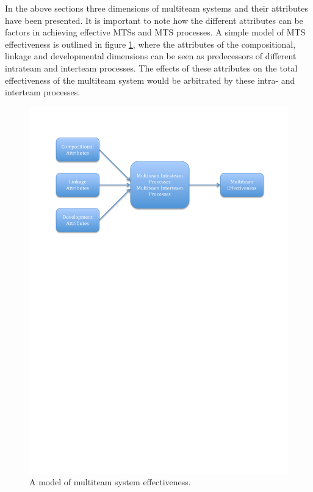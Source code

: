 In the above sections three dimensions of multiteam systems and their attributes have been presented. It is important to note how the different attributes can be factors in achieving effective MTSs and MTS processes. A simple model of MTS effectiveness is outlined in figure \ref{amomse}, where the attributes of the compositional, linkage and developmental dimensions can be seen as predecessors of different intrateam and interteam processes. The effects of these attributes on the total effectiveness of the multiteam system would be arbitrated by these intra- and interteam processes.

\begin{figure}[ht!]
\centering
\includegraphics[trim = 15mm 190mm 15mm 10mm, width=150mm]{images/multiteam_system_model.pdf}
\caption{A model of multiteam system effectiveness.}
\label{amomse}
\end{figure}

